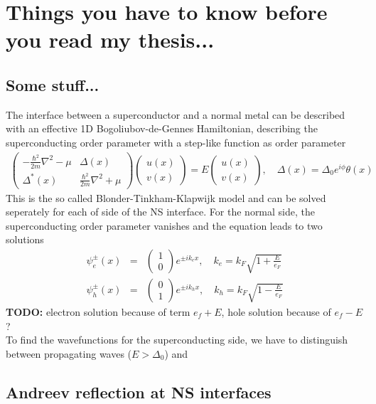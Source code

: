 \chapter{Things you have to know before you read my thesis...}
\label{ch:basics}
\section{Some stuff...}
The interface between a superconductor and a normal metal can be described with an effective 1D Bogoliubov-de-Gennes Hamiltonian, describing the superconducting order parameter with a step-like function as order parameter
\begin{eqnarray}
\begin{pmatrix}
-\frac{\hbar^2}{2m} \nabla^2 - \mu & \Delta(x) \\
\Delta^*(x) & \frac{\hbar^2}{2m} \nabla^2 + \mu
\end{pmatrix}
\begin{pmatrix}
u(x) \\
v(x)
\end{pmatrix} = E 
\begin{pmatrix}
u(x)\\
v(x)
\end{pmatrix}, \quad \Delta(x) = \Delta_0 e^{i \phi} \theta(x)
\end{eqnarray}
This is the so called Blonder-Tinkham-Klapwijk model and can be solved seperately for each of side of the NS interface. For the normal side, the superconducting order parameter vanishes and the equation leads to two solutions
\begin{eqnarray}
\psi_e^{\pm}(x) &=& \begin{pmatrix} 1 \\ 0 \end{pmatrix} e^{\pm i k_e x}, \quad k_e = k_F \sqrt{1 + \frac{E}{e_F}}\\ 
\psi_h^{\pm}(x) &=& \begin{pmatrix} 0 \\ 1 \end{pmatrix} e^{\pm i k_h x}, \quad k_h =  k_F \sqrt{1 - \frac{E}{e_F}}
\end{eqnarray}
\textbf{TODO:} electron solution because of term $e_f + E$, hole solution because of $e_f - E$ ? \\
To find the wavefunctions for the superconducting side, we have to distinguish between propagating waves ($E > \Delta_0$) and 

\section{Andreev reflection at NS interfaces}

